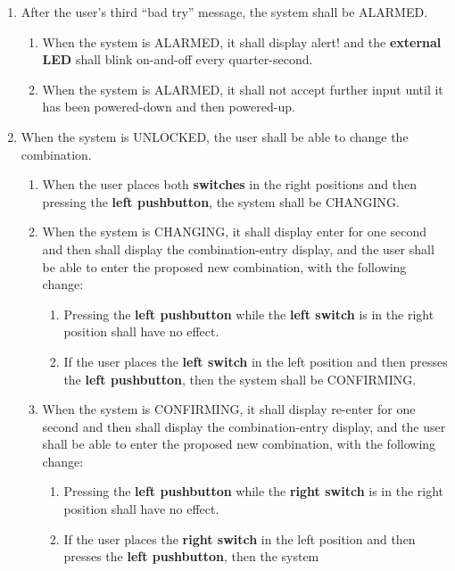 \begin{enumerate}
\item After the user's third ``bad try'' message, the system shall be ALARMED.
    \begin{enumerate}
    \item When the system is ALARMED, it shall display {\dviiseg alert!} and
        the \textbf{external LED} shall blink on-and-off every quarter-second.
    \item When the system is ALARMED, it shall not accept further input until
        it has been powered-down and then powered-up.
    \end{enumerate}
\item \label{spec:changeCombination} When the system is UNLOCKED, the user shall
    be able to change the combination.
    \begin{enumerate}
    \item When the user places both \textbf{switches} in the right positions and
        then pressing the \textbf{left pushbutton}, the system shall be
        CHANGING.
    \item When the system is CHANGING, it shall display {\dviiseg enter} for
        one second and then shall display the combination-entry display, and
        the user shall be able to enter the proposed new combination, with the
        following change:
        \begin{enumerate}
        \item Pressing the \textbf{left pushbutton} while the
            \textbf{left switch} is in the right position shall have no effect.
        \item If the user places the \textbf{left switch} in the left position
            and then presses the \textbf{left pushbutton}, then the system
            shall be CONFIRMING.
        \end{enumerate}
    \item When the system is CONFIRMING, it shall display {\dviiseg re-enter}
        for one second and then shall display the combination-entry display, and
        the user shall be able to enter the proposed new combination, with the
        following change:
        \begin{enumerate}
        \item Pressing the \textbf{left pushbutton} while the
            \textbf{right switch} is in the right position shall have no effect.
        \item If the user places the \textbf{right switch} in the left position
            and then presses the \textbf{left pushbutton}, then the system

\end{enumerate}
\end{enumerate}
\end{enumerate}

